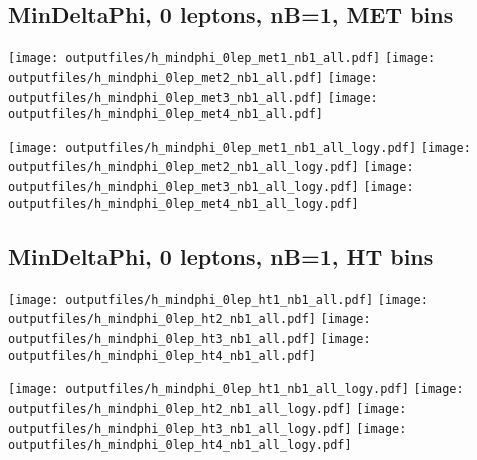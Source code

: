 \documentclass[11pt]{article}
\begin{document}
    \clearpage


    \subsection{ MinDeltaPhi, 0 leptons, nB=1, MET bins }

    \noindent
     \texttt{[image: outputfiles/h\_mindphi\_0lep\_met1\_nb1\_all.pdf]}
     \texttt{[image: outputfiles/h\_mindphi\_0lep\_met2\_nb1\_all.pdf]}
     \texttt{[image: outputfiles/h\_mindphi\_0lep\_met3\_nb1\_all.pdf]}
     \texttt{[image: outputfiles/h\_mindphi\_0lep\_met4\_nb1\_all.pdf]}

    \noindent
     \texttt{[image: outputfiles/h\_mindphi\_0lep\_met1\_nb1\_all\_logy.pdf]}
     \texttt{[image: outputfiles/h\_mindphi\_0lep\_met2\_nb1\_all\_logy.pdf]}
     \texttt{[image: outputfiles/h\_mindphi\_0lep\_met3\_nb1\_all\_logy.pdf]}
     \texttt{[image: outputfiles/h\_mindphi\_0lep\_met4\_nb1\_all\_logy.pdf]}

    \clearpage



    \subsection{ MinDeltaPhi, 0 leptons, nB=1, HT bins }

    \noindent
     \texttt{[image: outputfiles/h\_mindphi\_0lep\_ht1\_nb1\_all.pdf]}
     \texttt{[image: outputfiles/h\_mindphi\_0lep\_ht2\_nb1\_all.pdf]}
     \texttt{[image: outputfiles/h\_mindphi\_0lep\_ht3\_nb1\_all.pdf]}
     \texttt{[image: outputfiles/h\_mindphi\_0lep\_ht4\_nb1\_all.pdf]}

    \noindent
     \texttt{[image: outputfiles/h\_mindphi\_0lep\_ht1\_nb1\_all\_logy.pdf]}
     \texttt{[image: outputfiles/h\_mindphi\_0lep\_ht2\_nb1\_all\_logy.pdf]}
     \texttt{[image: outputfiles/h\_mindphi\_0lep\_ht3\_nb1\_all\_logy.pdf]}
     \texttt{[image: outputfiles/h\_mindphi\_0lep\_ht4\_nb1\_all\_logy.pdf]}

    \clearpage







  
\end{document}
